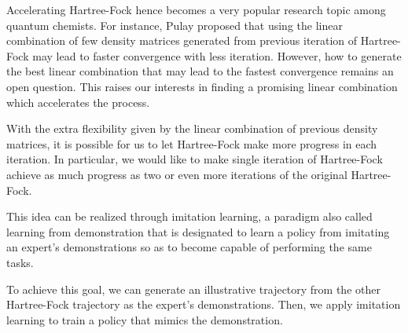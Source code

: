\documentclass[twoside]{article}
\begin{document}

Accelerating Hartree-Fock hence becomes a very popular research topic among quantum chemists. For instance, Pulay \cite{Pulay1980} proposed that using the linear combination of few density matrices generated from previous iteration of Hartree-Fock may lead to faster convergence with less iteration. However, how to generate the best linear combination that may lead to the fastest convergence remains an open question. This raises our interests in finding a promising linear combination which accelerates the process. %



With the extra flexibility given by the linear combination of previous density matrices, it is possible for us to let Hartree-Fock make more progress in each iteration. 
In particular, we would like to make single iteration of Hartree-Fock achieve as much progress as two or even more iterations of the original Hartree-Fock.




This idea can be realized through imitation learning, a paradigm also called learning from demonstration that is designated to learn a policy from imitating an expert's demonstrations so as to become capable of performing the same tasks. 

To achieve this goal, we can generate an illustrative trajectory from the other Hartree-Fock trajectory as the expert's demonstrations. Then, we apply imitation learning to train a policy that mimics the demonstration. 
\end{document}
